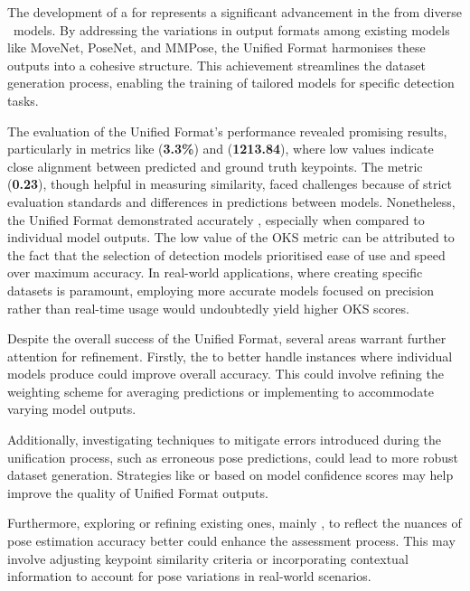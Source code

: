 
The development of a  for  represents a significant advancement in  the  from diverse \NN\ models. By addressing the variations in output formats among existing models like MoveNet, PoseNet, and MMPose, the Unified Format harmonises these outputs into a cohesive structure. This achievement streamlines the dataset generation process, en\-abling the training of tailored models for specific detection tasks.

The evaluation of the Unified Format's performance revealed promising results, particularly in metrics like \pojem{\APE} ({\bf 3.3\%}) and \pojem{\MSE} ({\bf 1213.84}), where low values indicate close alignment between predicted and ground truth keypoints. The \pojem{\OKS} metric ({\bf 0.23}), though helpful in measuring similarity, faced challenges because of strict evaluation standards and differences in predictions between models. Nonetheless, the Unified Format demonstrated  accurately , especially when compared to individual model outputs. The low value of the OKS metric can be attributed to the fact that the selection of detection models prioritised ease of use and speed over maximum accuracy. In real-world applications, where creating specific datasets is paramount, employing more accurate models focused on precision rather than real-time usage would undoubtedly yield higher OKS scores.

Despite the overall success of the Unified Format, several areas warrant further attention for refinement. Firstly,  the  to better handle instances where individual models produce  could improve overall accuracy. This could involve refining the weighting scheme for averaging predictions or implementing  to accommodate varying model outputs.

Additionally, investigating techniques to mitigate errors introduced during the unification process, such as erroneous pose predictions, could lead to more robust dataset generation. Strategies like  or  based on model confidence scores may help improve the quality of Unified Format outputs.

Furthermore, exploring  or refining existing ones, mainly \pojem{\OKS}, to reflect the nuances of pose estimation accuracy better could enhance the assessment process. This may involve adjusting keypoint similarity criteria or incorporating contextual information to account for pose variations in real-world scenarios.

